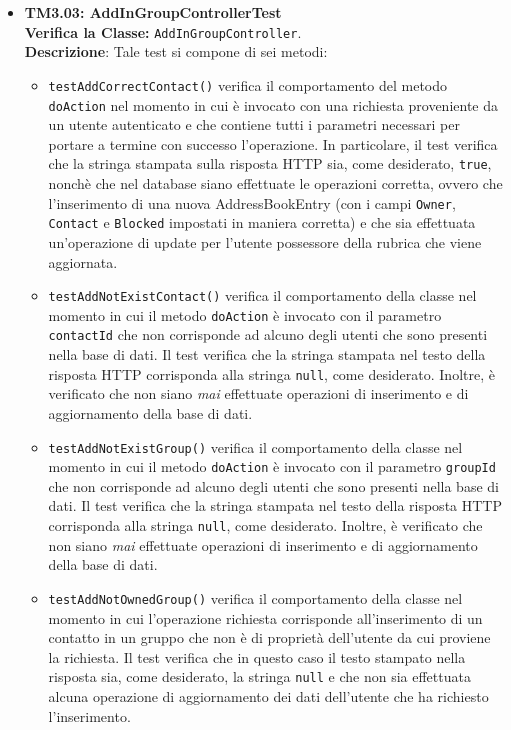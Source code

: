 \begin{itemize}
\item \textbf{TM3.03: AddInGroupControllerTest}\\
\textbf{Verifica la Classe:} \texttt{AddInGroupController}.\\
\textbf{Descrizione}: %
Tale test si compone di sei metodi: 
\begin{itemize}

\item \texttt{testAddCorrectContact()} verifica il comportamento del metodo \texttt{doAction} nel momento in cui è invocato con una richiesta proveniente da un utente autenticato e che contiene tutti i parametri necessari per portare a termine con successo l'operazione. In particolare, il test verifica che la stringa stampata sulla risposta HTTP sia, come desiderato, \texttt{true}, nonchè che nel database siano effettuate le operazioni corretta, ovvero che l'inserimento di una nuova AddressBookEntry (con i campi \texttt{Owner}, \texttt{Contact} e \texttt{Blocked} impostati in maniera corretta) e che sia effettuata un'operazione di update per l'utente possessore della rubrica che viene aggiornata.

\item \texttt{testAddNotExistContact()} verifica il comportamento della classe nel momento in cui il metodo \texttt{doAction} è invocato con il parametro \texttt{contactId} che non corrisponde ad alcuno degli utenti che sono presenti nella base di dati. Il test verifica che la stringa stampata nel testo della risposta HTTP corrisponda alla stringa \texttt{null}, come desiderato. Inoltre, è verificato che non siano \textit{mai} effettuate operazioni di inserimento e di aggiornamento della base di dati.

\item \texttt{testAddNotExistGroup()} verifica il comportamento della classe nel momento in cui il metodo \texttt{doAction} è invocato con il parametro \texttt{groupId} che non corrisponde ad alcuno degli utenti che sono presenti nella base di dati. Il test verifica che la stringa stampata nel testo della risposta HTTP corrisponda alla stringa \texttt{null}, come desiderato. Inoltre, è verificato che non siano \textit{mai} effettuate operazioni di inserimento e di aggiornamento della base di dati.

\item \texttt{testAddNotOwnedGroup()} verifica il comportamento della classe nel momento in cui l'operazione richiesta corrisponde all'inserimento di un contatto in un gruppo che non è di proprietà dell'utente da cui proviene la richiesta. Il test verifica che in questo caso il testo stampato nella risposta sia, come desiderato, la stringa \texttt{null} e che non sia effettuata alcuna operazione di aggiornamento dei dati dell'utente che ha richiesto l'inserimento.


\end{itemize}
\end{itemize}
